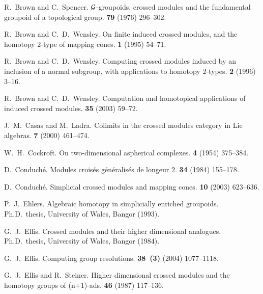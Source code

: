 \begin{thebibliography}{notes}
R.~Brown and C.~Spencer.
\newblock $\mathcal{G}$-groupoids, crossed modules and the fundamental groupoid of a
  topological group.
 {\bf 79} (1976) 296--302.

R.~Brown and C.~D.~Wensley.
\newblock On finite induced crossed modules, and the homotopy $2$-type of
  mapping cones.
 {\bf 1} (1995) 54--71.

R.~Brown and C.~D.~Wensley.
\newblock Computing crossed modules induced by an inclusion of a normal
  subgroup, with applications to homotopy $2$-types.
 {\bf 2} (1996) 3--16.

R.~Brown and C.~D.~Wensley.
\newblock Computation and homotopical applications of induced crossed modules.
 {\bf 35} (2003) 59--72.

J.~M.~Casas and M.~Ladra.
\newblock Colimits in the crossed modules category in Lie algebras.
 {\bf 7} (2000) 461--474.

W.~H.~Cockroft.
\newblock On two-dimensional aspherical complexes.
 {\bf 4} (1954) 375--384.

D.~Conduch\'e.
\newblock Modules crois\'es g\'en\'eralis\'es de longeur $2$.
 {\bf 34} (1984) 155--178.

D.~Conduch\'e.
\newblock Simplicial crossed modules and mapping cones.
 {\bf 10} (2003) 623--636.

P.~J.~Ehlers.
\newblock Algebraic homotopy in simplicially enriched groupoids.
\newblock Ph.{D}.~thesis, University of Wales, Bangor (1993).

G.~J.~Ellis.
\newblock Crossed modules and their higher dimensional analogues.
\newblock Ph.{D}.~thesis, University of Wales, Bangor (1984).

G.~J.~Ellis.
\newblock Computing group resolutions.
 {\bf 38~(3)} (2004) 1077--1118.

G.~J.~Ellis and R.~Steiner.
\newblock Higher dimensional crossed modules and the homotopy groups of
  (n+1)-ads.
 {\bf 46} (1987) 117--136.


\end{thebibliography}
